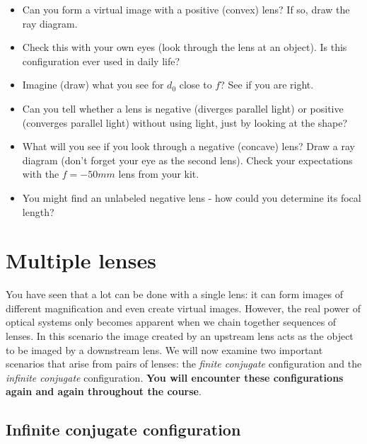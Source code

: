 \documentclass[a4paper]{report}
\begin{document}
    \begin{itemize}
        \item Can you form a virtual image with a positive (convex) lens? If so, draw the ray diagram. 
        \item Check this with your own eyes (look through the lens at an object). Is this configuration ever used in daily life?
        \item Imagine (draw) what you see for $d_0$ close to $f$? See if you are right.
        \item Can you tell whether a lens is negative (diverges parallel light) or positive (converges parallel light) without using light, just by looking at the shape?
        \item What will you see if you look through a negative (concave) lens? Draw a ray diagram (don't forget your eye as the second lens). Check your expectations with the $f=-50mm$ lens from your kit.
        \item You might find an unlabeled negative lens - how could you determine its focal length?
    \end{itemize}

    \clearpage
	
	
	\section{Multiple lenses}
	
	You have seen that a lot can be done with a single lens: it can form images of different magnification and even create virtual images. 
	However, the real power of optical systems only becomes apparent when we chain together sequences of lenses. 
	In this scenario the image created by an upstream lens acts as the object to be imaged by a downstream lens.
	We will now examine two important scenarios that arise from pairs of lenses: the \emph{finite conjugate} configuration and the \emph{infinite conjugate} configuration. 
	\textbf{You will encounter these configurations again and again throughout the course}.
	
	\subsection{Infinite conjugate configuration}
	\hypertarget{hintBack-infinite}{}
	
\end{document}
